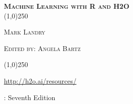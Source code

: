 %



\usepackage{url}
\def\UrlBreaks{\do\/\do-\do_}





\thispagestyle{empty} %

\begin{center}
\textsc{\Large\bf{Machine Learning with R and H2O}}
\\
\bigskip
\line(1,0){250}  %

\textsc{\small {Mark Landry}}

\textsc{\small {Edited by: Angela Bartz}}

\line(1,0){250}  %

{\url{http://h2o.ai/resources/}}

\bigskip
\monthname \hspace{1pt}  \the\year: Seventh Edition

\bigskip
\end{center}


\newpage
\restoregeometry

\null\vfill %
\thispagestyle{empty} %


